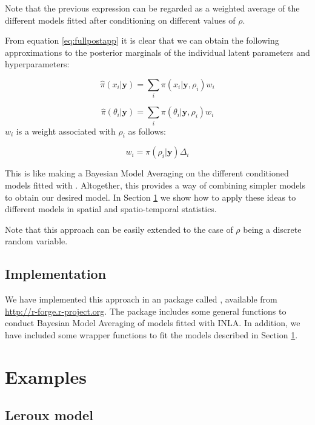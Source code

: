 \documentclass[article]{jss}
\begin{document}
Note that the previous expression can be regarded as a weighted average
of the different models fitted after conditioning on different values of
$\rho$.

From equation \ref{eq:fullpostapp} it is clear that we can obtain the following
approximations to the posterior marginals of the individual latent parameters
and hyperparameters:

$$
\hat{\pi}(x_i|\mathbf{y}) = \sum_i \pi(x_i|\mathbf{y}, \rho_i) w_i
$$

$$
\hat{\pi}(\theta_i|\mathbf{y}) = \sum_i \pi(\theta_i|\mathbf{y}, \rho_i) w_i
$$
\noindent
$w_i$ is a weight associated with $\rho_i$ as follows:

$$
w_i = \pi(\rho_i|\mathbf{y})\Delta_i
$$

This is like making a Bayesian Model Averaging \citep{Hoetingetal:1999} on the
different conditioned models fitted with . Altogether, this
provides a way of combining simpler models to obtain our desired model. In
Section \ref{sec:examples} we show how to apply these ideas to different models
in spatial and spatio-temporal statistics.


%

Note that this approach can be easily extended to the case of $\rho$ being
a discrete random variable.


\subsection{Implementation}

We have implemented this approach in an  package called ,
available from \url{http://r-forge.r-project.org}. The package includes some
general functions to conduct Bayesian Model Averaging of models fitted with
INLA. In addition, we have included some wrapper functions to fit the models
described in Section \ref{sec:examples}.


\section{Examples}
\label{sec:examples}

\subsection{Leroux model}
\end{document}
